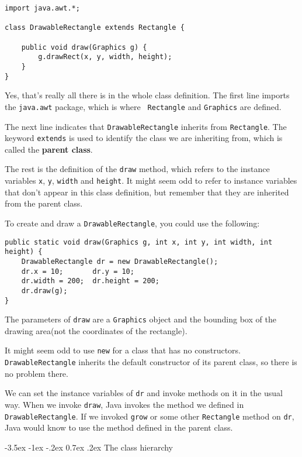 \documentclass{book}
\makeatletter
\renewcommand{\section}{\@startsection 
    {section} {1} {0mm}%
    {-3.5ex \@plus -1ex \@minus -.2ex}%
    {0.7ex \@plus.2ex}%
    {\normalfont\Large\bfseries}}
\makeatother
\begin{document}
\begin{verbatim}
import java.awt.*;

class DrawableRectangle extends Rectangle {

    public void draw(Graphics g) {
        g.drawRect(x, y, width, height);
    }
}
\end{verbatim}

Yes, that's really all there is in the whole class definition.  The
first line imports the {\tt java.awt} package, which is where {\tt
Rectangle} and {\tt Graphics} are defined.


The next line indicates that {\tt DrawableRectangle} inherits from
{\tt Rectangle}.  The keyword {\tt extends} is used to identify the
class we are inheriting from, which is called the {\bf parent class}.

The rest is the definition of the {\tt draw} method, which refers to
the instance variables {\tt x}, {\tt y}, {\tt width} and {\tt height}.
It might seem odd to refer to instance variables that don't appear in
this class definition, but remember that they are inherited from the
parent class.

To create and draw a {\tt DrawableRectangle}, you could use
the following:

\begin{verbatim}
public static void draw(Graphics g, int x, int y, int width, int height) {
    DrawableRectangle dr = new DrawableRectangle();
    dr.x = 10;       dr.y = 10;
    dr.width = 200;  dr.height = 200;
    dr.draw(g);
}
\end{verbatim}

The parameters of {\tt draw} are a {\tt Graphics} object and
the bounding box of the drawing area(not the coordinates of the
rectangle).

It might seem odd to use {\tt new} for a class
that has no constructors.  {\tt DrawableRectangle}
inherits the default constructor of its parent class, so there
is no problem there.


We can set the instance variables of {\tt dr} and invoke methods
on it in the usual way.  When we invoke {\tt draw}, Java invokes
the method we defined in {\tt DrawableRectangle}.  If we invoked
{\tt grow} or some other {\tt Rectangle} method on {\tt dr}, Java
would know to use the method defined in the parent class.


\section{The class hierarchy}
\end{document}
